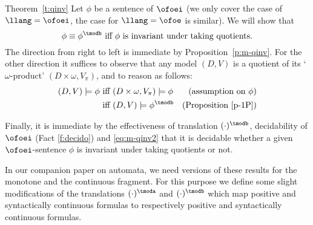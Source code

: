 \begin{proofof}{Theorem~\ref{t:qinv}}
Let $\phi$ be a sentence of $\ofoei$ (we only cover the case of $\llang = 
\ofoei$, the case for $\llang = \ofoe$ is similar).
We will show that 
\begin{equation}
\label{eq:m-qinv2}
\phi \equiv \phi^{\tmodb} \text{ iff } \text{$\phi$ is invariant under 
taking quotients}.
\end{equation}
The direction from right to left is immediate by Proposition~\ref{p:m-qinv}.
For the other direction it suffices to observe that any model $(D,V)$ is a 
quotient of its `$\omega$-product' $(D\times \omega, V_\pi)$, and to 
reason as follows:
\begin{align*}
(D,V) \models \phi 
   & \text{ iff } (D\times \omega, V_\pi) \models \phi
   & \text{(assumption on $\phi$)}
\\ & \text{ iff } (D,V) \models \phi^{\tmodb}
   & \text{(Proposition~\ref{p-1P})}
\end{align*}

Finally, it is immediate by the effectiveness of translation  $(\cdot)^{\tmodb}$, decidability of $\ofoei$ (Fact \ref{f:decido}) and \eqref{eq:m-qinv2}
that it is decidable whether a given $\ofoei$-sentence $\phi$ is invariant under 
taking quotients or not.
\end{proofof}


In our companion paper \cite{companionWEAK} on automata, we need versions of these results for 
the monotone and the continuous fragment.
For this purpose we define some slight modifications of the translations 
$(\cdot)^{\tmoda}$ and $(\cdot)^{\tmodb}$ which map positive and syntactically 
continuous formulas to respectively positive and syntactically continuous 
formulas.

